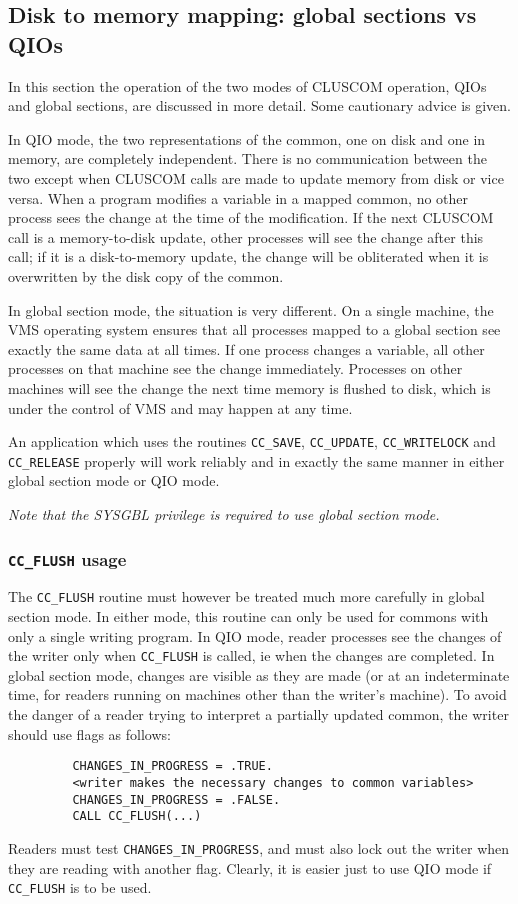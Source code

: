 \subsection{Disk to memory mapping: global sections vs QIOs}
In this section the operation of the two modes of CLUSCOM operation,
QIOs and global sections, are discussed in more detail.
Some cautionary advice is given.

In QIO mode, the two representations of the common, one on disk
and one in memory, are completely independent. There is no communication
between the two except when CLUSCOM calls are made to update memory
from disk or vice versa. When a program modifies a variable in
a mapped common, no other process sees the change at the time of the
modification. If the next CLUSCOM call is a memory-to-disk update,
other processes will see the change after this call; if it is a
disk-to-memory update, the change will be obliterated when it is
overwritten by the disk copy of the common.

In global section mode, the situation is very different. On a single
machine, the VMS operating system ensures that all processes mapped to
a global section see exactly the same data at all times. If one process
changes a variable, all other processes on that machine 
see the change immediately.
Processes on other machines will see the change the next time memory
is flushed to disk, which is under the control of VMS and
may happen at any time.

An application which uses the routines \verb|CC_SAVE|, \verb|CC_UPDATE|,
\verb|CC_WRITELOCK| and
\verb|CC_RELEASE| properly will work reliably and in exactly the same
manner in either global section mode or QIO mode.

{\em Note that the SYSGBL privilege is required to use global section mode.}

\subsubsection{{\tt CC\_FLUSH}  usage}
The \verb|CC_FLUSH| routine must however be treated much more carefully in
global section mode. In either mode, this routine can only be used
for commons with only a single writing program.
In QIO mode, reader processes see the changes
of the writer only when \verb|CC_FLUSH| is called, ie when the changes are
completed. In global section mode, changes are visible as they are
made (or at an indeterminate time, for readers running on machines other
than the writer's machine). To avoid the danger of a reader trying to
interpret a partially updated common, the writer should use flags as
follows:
\begin{verbatim}
         CHANGES_IN_PROGRESS = .TRUE.
         <writer makes the necessary changes to common variables>
         CHANGES_IN_PROGRESS = .FALSE.
         CALL CC_FLUSH(...)
\end{verbatim}
Readers must test \verb|CHANGES_IN_PROGRESS|, and must also lock out the writer
when they are reading with another flag. Clearly, it is easier just to use
QIO mode if \verb|CC_FLUSH| is to be used.

